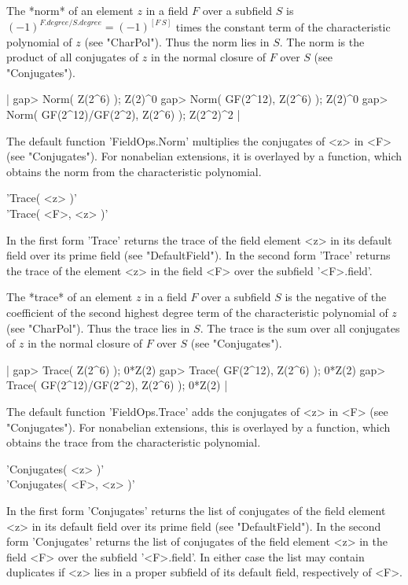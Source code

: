 The  *norm* of an element $z$ in  a field $F$ over a subfield  $S$ is
$(-1)^{F.degree/S.degree}=(-1)^{[F\:S]}$  times  the  constant  term  of  the
characteristic polynomial of $z$ (see "CharPol"). Thus the norm lies in $S$.
The norm is the product of all conjugates of $z$ in the normal closure of
$F$ over $S$ (see "Conjugates").

|    gap> Norm( Z(2^6) );
    Z(2)^0
    gap> Norm( GF(2^12), Z(2^6) );
    Z(2)^0
    gap> Norm( GF(2^12)/GF(2^2), Z(2^6) );
    Z(2^2)^2 |

The default function 'FieldOps.Norm'  multiplies the conjugates of <z> in
<F>  (see  "Conjugates"). For nonabelian extensions, it is overlayed by a
function, which obtains the norm from the characteristic polynomial.


'Trace( <z> )' \\
'Trace( <F>, <z> )'

In the first form 'Trace' returns the trace  of the  field element <z> in
its  default field over   its prime field (see  "DefaultField").   In the
second form 'Trace' returns the trace of the element <z> in the field <F>
over the subfield '<F>.field'.

The  *trace* of an element $z$ in a field $F$ over a  subfield $S$ is the
negative  of the coefficient of  the  second  highest degree
term of the characteristic polynomial of $z$ (see "CharPol").
Thus the trace lies in $S$. The trace is the
sum  over  all  conjugates  of $z$  in the normal closure of $F$  over $S$
(see "Conjugates").

|    gap> Trace( Z(2^6) );
    0*Z(2)
    gap> Trace( GF(2^12), Z(2^6) );
    0*Z(2)
    gap> Trace( GF(2^12)/GF(2^2), Z(2^6) );
    0*Z(2) |

The default function 'FieldOps.Trace' adds the conjugates  of <z>  in <F>
(see "Conjugates").  For nonabelian extensions, this is overlayed by a
function, which obtains the trace from the characteristic polynomial.


'Conjugates( <z> )' \\
'Conjugates( <F>, <z> )'

In the  first form 'Conjugates'   returns the list   of conjugates of the
field element  <z>  in  its  default  field   over its prime   field (see
"DefaultField").  In the second  form  'Conjugates'  returns the list  of
conjugates of  the field element <z>  in the field <F> over  the subfield
'<F>.field'.  In either case the list may contain  duplicates if <z> lies
in a proper subfield of its default field, respectively of <F>.

